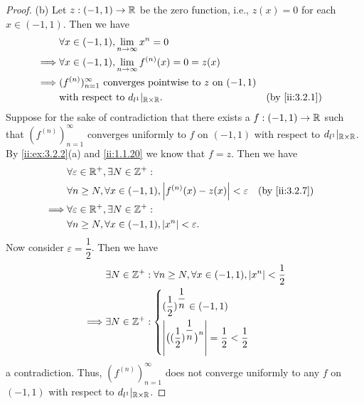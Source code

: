 \begin{proof}{(b)}
  Let \(z : (-1, 1) \to \mathbb{R}\) be the zero function, i.e., \(z(x) = 0\) for each \(x \in (-1, 1)\).
  Then we have
  \begin{align*}
             & \forall x \in (-1, 1), \lim_{n \to \infty} x^n = 0                                                \\
    \implies & \forall x \in (-1, 1), \lim_{n \to \infty} f^{(n)}(x) = 0 = z(x)                                  \\
    \implies & (f^{(n)})_{n = 1}^\infty \text{ converges pointwise to } z \text{ on } (-1, 1)                    \\
             & \text{with respect to } d_{l^1}|_{\R \times \R}.                               &  & \by{ii:3.2.1}
  \end{align*}
  Suppose for the sake of contradiction that there exists a \(f : (-1, 1) \to \mathbb{R}\) such that \((f^{(n)})_{n = 1}^\infty\) converges uniformly to \(f\) on \((-1, 1)\) with respect to \(d_{l^1}|_{\mathbb{R} \times \mathbb{R}}\).
  By \cref{ii:ex:3.2.2}(a) and \cref{ii:1.1.20} we know that \(f = z\).
  Then we have
  \begin{align*}
             & \forall \varepsilon \in \R^+, \exists N \in \Z^+ :                                                \\
             & \forall n \geq N, \forall x \in (-1, 1), \abs{f^{(n)}(x) - z(x)} < \varepsilon &  & \by{ii:3.2.7} \\
    \implies & \forall \varepsilon \in \R^+, \exists N \in \Z^+ :                                                \\
             & \forall n \geq N, \forall x \in (-1, 1), \abs{x^n} < \varepsilon.
  \end{align*}
  Now consider \(\varepsilon = \dfrac{1}{2}\).
  Then we have
  \begin{align*}
             & \exists N \in \mathbb{Z}^+ : \forall n \geq N, \forall x \in (-1, 1), \left\lvert x^n\right\rvert < \dfrac{1}{2}                                               \\
    \implies & \exists N \in \mathbb{Z}^+ : \begin{dcases}
                                      (\dfrac{1}{2})^{\dfrac{1}{n}} \in (-1, 1) \\
                                      \left\lvert\big((\dfrac{1}{2})^{\dfrac{1}{n}}\big)^n\right\rvert = \dfrac{1}{2} < \dfrac{1}{2}
                                    \end{dcases}
  \end{align*}
  a contradiction.
  Thus, \((f^{(n)})_{n = 1}^\infty\) does not converge uniformly to any \(f\) on \((-1, 1)\) with respect to \(d_{l^1}|_{\mathbb{R} \times \mathbb{R}}\).
\end{proof}

